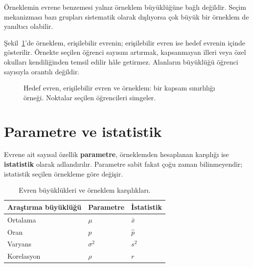 \begin{mistakebox}
Örneklemin evrene benzemesi yalnız örneklem büyüklüğüne bağlı değildir.
Seçim mekanizması bazı grupları sistematik olarak dışlıyorsa çok büyük bir
örneklem de yanıltıcı olabilir.
\end{mistakebox}

Şekil~\ref{fig:population-nesting}'de örneklem, erişilebilir evrenin;
erişilebilir evren ise hedef evrenin içinde gösterilir. Örnekte seçilen
öğrenci sayısını artırmak, kapsanmayan illeri veya özel okulları kendiliğinden
temsil edilir hâle getirmez. Alanların büyüklüğü öğrenci sayısıyla orantılı
değildir.

\begin{figure}[H]
\centering
{}
\caption{Hedef evren, erişilebilir evren ve örneklem: bir kapsam sınırlılığı
örneği. Noktalar seçilen öğrencileri simgeler.}
\label{fig:population-nesting}
\end{figure}

\section{Parametre ve istatistik}
\label{sec:population-parameter}

Evrene ait sayısal özellik \textbf{parametre}, örneklemden hesaplanan karşılığı
ise \textbf{istatistik} olarak adlandırılır. Parametre sabit fakat çoğu zaman
bilinmeyendir; istatistik seçilen örnekleme göre değişir.

\begin{table}[H]
\centering
\caption{Evren büyüklükleri ve örneklem karşılıkları.}
\label{tab:population-sample-examples}
\begin{tabular}{lll}
\toprule
Araştırma büyüklüğü & Parametre & İstatistik \\
\midrule
Ortalama & $\mu$ & $\bar x$ \\
Oran & $p$ & $\hat p$ \\
Varyans & $\sigma^2$ & $s^2$ \\
Korelasyon & $\rho$ & $r$ \\
\bottomrule
\end{tabular}
\end{table}

